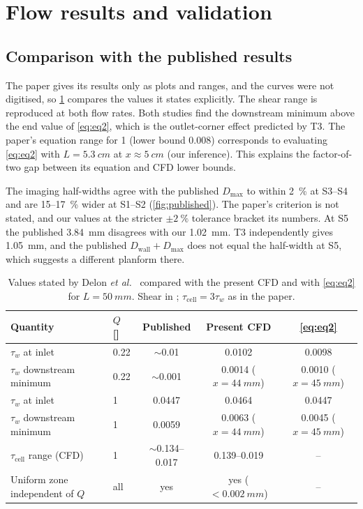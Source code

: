 \documentclass[11pt,a4paper]{article}
\newcommand{\ulmin}{\si{\uLmin}}
\newcommand{\taw}{\tau_{w}}
\begin{document}
\section{Flow results and validation}
\label{sec:validation}

\subsection{Comparison with the published results}

The paper gives its results only as plots and ranges, and the curves were not digitised, so \cref{tab:published} compares the values it states explicitly. The shear range is reproduced at both flow rates. Both studies find the downstream minimum above the end value of \cref{eq:eq2}, which is the outlet-corner effect predicted by T3. The paper's equation range for \SI{1}{\uLmin} (lower bound 0.008) corresponds to evaluating \cref{eq:eq2} with $L=\SI{5.3}{cm}$ at $x\approx\SI{5}{cm}$ (our inference). This explains the factor-of-two gap between its equation and CFD lower bounds.

The imaging half-widths agree with the published $D_{\max}$ to within \SI{2}{\percent} at S3--S4 and are 15--\SI{17}{\percent} wider at S1--S2 (\cref{fig:published}). The paper's criterion is not stated, and our values at the stricter $\pm\SI{2}{\percent}$ tolerance bracket its numbers. At S5 the published \SI{3.84}{mm} disagrees with our \SI{1.02}{mm}. T3 independently gives \SI{1.05}{mm}, and the published $D_{\mathrm{wall}}+D_{\max}$ does not equal the half-width at S5, which suggests a different planform there.

\begin{table}[t]
\centering
\caption{Values stated by Delon \emph{et al.}~\citep{Delon2020} compared with the present CFD and with \cref{eq:eq2} for $L=\SI{50}{mm}$. Shear in \si{\dyncm}; $\tau_{\mathrm{cell}}=3\taw$ as in the paper.}
\label{tab:published}
\small
\begin{tabular}{@{}llccc@{}}
\toprule
Quantity & $Q$ [\ulmin] & Published & Present CFD & \cref{eq:eq2}\\
\midrule
$\taw$ at inlet & 0.22 & $\sim$0.01 & 0.0102 & 0.0098\\
$\taw$ downstream minimum & 0.22 & $\sim$0.001 & 0.0014 ($x=\SI{44}{mm}$) & 0.0010 ($x=\SI{45}{mm}$)\\
$\taw$ at inlet & 1 & 0.0447 & 0.0464 & 0.0447\\
$\taw$ downstream minimum & 1 & 0.0059 & 0.0063 ($x=\SI{44}{mm}$) & 0.0045 ($x=\SI{45}{mm}$)\\
$\tau_{\mathrm{cell}}$ range (CFD) & 1 & $\sim$0.134--0.017 & 0.139--0.019 & --\\
Uniform zone independent of $Q$ & all & yes & yes ($<\SI{0.002}{mm}$) & --\\
\bottomrule
\end{tabular}
\end{table}
\end{document}
